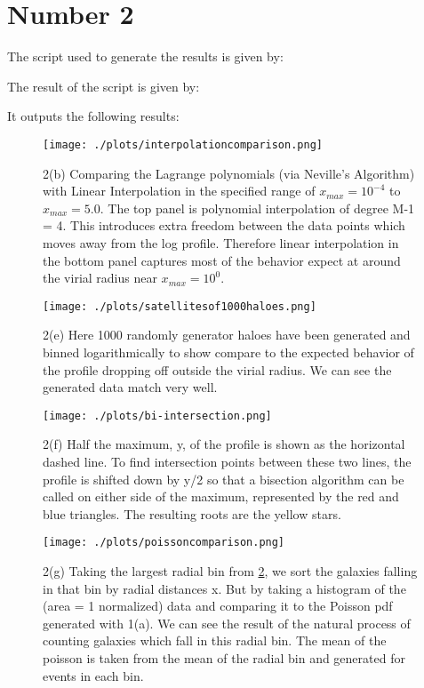 \section{Number 2}

The script used to generate the results is given by:



The result of the script is given by:

It outputs the following results:



\begin{figure}[h!]
  \centering
  \texttt{[image: ./plots/interpolationcomparison.png]}
  \caption{2(b) Comparing the Lagrange polynomials (via Neville's Algorithm) with Linear Interpolation in the specified range of $x_{max} = 10^{-4}$ to $x_{max} = 5.0$. The top panel is polynomial interpolation of degree M-1 = 4. This introduces extra freedom between the data points which moves away from the log profile. Therefore linear interpolation in the bottom panel captures most of the behavior expect at around the virial radius near $x_{max} = 10^{0}$. }
  \label{fig:interpcompare}
\end{figure}

\begin{figure}[h!]
  \centering
  \texttt{[image: ./plots/satellitesof1000haloes.png]}
  \caption{2(e) Here 1000 randomly generator haloes have been generated and binned logarithmically to show compare to the expected behavior of the profile dropping off outside the virial radius. We can see the generated data match very well.}
  \label{fig:1000haloes}
\end{figure}


\begin{figure}[h!]
  \centering
  \texttt{[image: ./plots/bi-intersection.png]}
  \caption{2(f) Half the maximum, y, of the profile is shown as the horizontal dashed line. To find intersection points between these two lines, the profile is shifted down by y/2 so that a bisection algorithm can be called on either side of the maximum, represented by the red and blue triangles. The resulting roots are the yellow stars.}
  \label{fig:intersection}
\end{figure}


\begin{figure}[h!]
  \centering
  \texttt{[image: ./plots/poissoncomparison.png]}
  \caption{2(g) Taking the largest radial bin from \ref{fig:1000haloes}, we sort the galaxies falling in that bin by radial distances x. But by taking a histogram of the (area = 1 normalized) data and comparing it to the Poisson pdf generated with 1(a). We can see the result of the natural process of counting galaxies which fall in this radial bin. The mean of the poisson is taken from the mean of the radial bin and generated for events in each bin.}
  \label{fig:comppoisson}
\end{figure}



